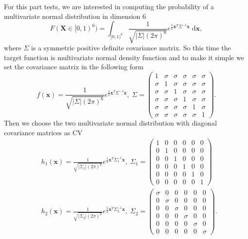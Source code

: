 For this part tests, we are interested in computing the probability of a multivariate normal distribution in dimension 6
\[
    F(\mathbf{X}\in[0,1)^6)=\int_{[0,1)^6}\frac{1}{\sqrt{|\Sigma|(2\pi)^6}}
        e^{\frac{1}{2}\mathbf{x}^T\Sigma^{-1}\mathbf{x}}
        \;\textrm{d}\mathbf{x},
    \]
where $\Sigma$ is a symmetric positive definite covariance matrix. 
So this time the target function is multivariate normal density function and to make it simple we set the covariance matrix in the following form 
\[
    f(\mathbf{x})= \frac{1}{\sqrt{|\Sigma|(2\pi)^6}}
        e^{\frac{1}{2}\mathbf{x}^T\Sigma^{-1}\mathbf{x}},\;
\Sigma=
\begin{pmatrix}
    1&\sigma&\sigma&\sigma&\sigma&\sigma\\[-1.5em]
    \sigma&1&\sigma&\sigma&\sigma&\sigma\\[-1.5em]
    \sigma&\sigma&1&\sigma&\sigma&\sigma\\[-1.5em]
    \sigma&\sigma&\sigma&1&\sigma&\sigma\\[-1.5em]
    \sigma&\sigma&\sigma&\sigma&1&\sigma\\[-1.5em]
    \sigma&\sigma&\sigma&\sigma&\sigma&1
\end{pmatrix}.
\]
Then we choose the two multivariate normal distribution with diagonal covariance matrices as CV 
\begin{align*}
&h_1(\mathbf{x})= \frac{1}{\sqrt{|\Sigma_1|(2\pi)^6}}
        e^{\frac{1}{2}\mathbf{x}^T\Sigma_1^{-1}\mathbf{x}},\;
    \Sigma_1=
\begin{pmatrix}
    1&0&0&0&0&0\\[-1.5em]
    0&1&0&0&0&0\\[-1.5em]
    0&0&1&0&0&0\\[-1.5em]
    0&0&0&1&0&0\\[-1.5em]
    0&0&0&0&1&0\\[-1.5em]
    0&0&0&0&0&1
\end{pmatrix}\\
&h_2(\mathbf{x})= \frac{1}{\sqrt{|\Sigma_2|(2\pi)^6}}
        e^{\frac{1}{2}\mathbf{x}^T\Sigma_2^{-1}\mathbf{x}},\;
\Sigma_2=
\begin{pmatrix}
    \sigma&0&0&0&0&0\\[-1.5em]
    0&\sigma&0&0&0&0\\[-1.5em]
    0&0&\sigma&0&0&0\\[-1.5em]
    0&0&0&\sigma&0&0\\[-1.5em]
    0&0&0&0&\sigma&0\\[-1.5em]
    0&0&0&0&0&\sigma
\end{pmatrix}.
\end{align*}
